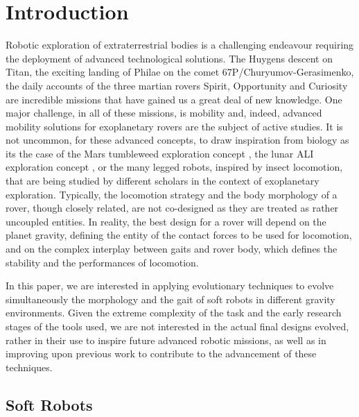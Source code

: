 \documentclass{sig-alternate}
\begin{document}
\section{Introduction}
Robotic exploration of extraterrestrial bodies is a challenging endeavour requiring the deployment of advanced technological solutions. The Huygens descent on Titan, the exciting landing of Philae on the comet 67P/Churyumov-Gerasimenko, the daily accounts of the three martian rovers Spirit, Opportunity and Curiosity are incredible missions that have gained us a great deal of new knowledge. One major challenge, in all of these missions, is mobility and, indeed, advanced mobility solutions for exoplanetary rovers are the subject of active studies. It is not uncommon, for these advanced concepts, to draw inspiration from biology as its the case of the Mars tumbleweed exploration concept \cite{antol2003low, ylikorpi2004biologically}, the lunar ALI exploration concept \cite{clark2005ali}, or the many legged robots, inspired by insect locomotion, that are being studied by different scholars in the context of exoplanetary exploration. Typically, the locomotion strategy and the body morphology of a rover, though closely related, are not co-designed as they are treated as rather uncoupled entities. In reality, the best design for a rover will depend on the planet gravity, defining the entity of the contact forces to be used for locomotion, and on the complex interplay between gaits and rover body, which defines the stability and the performances of locomotion.

In this paper, we are interested in applying evolutionary techniques to evolve simultaneously the morphology and the gait of soft robots in different gravity environments. Given the extreme complexity of the task and the early research stages of the tools used, we are not interested in the actual final designs evolved, rather in their use to inspire future advanced robotic missions, as well as in improving upon previous work to contribute to the advancement of these techniques.

\subsection{Soft Robots}
\end{document}
